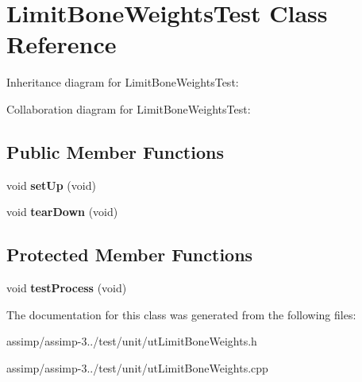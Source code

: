 \hypertarget{class_limit_bone_weights_test}{\section{Limit\+Bone\+Weights\+Test Class Reference}
\label{class_limit_bone_weights_test}
}


Inheritance diagram for Limit\+Bone\+Weights\+Test\+:


Collaboration diagram for Limit\+Bone\+Weights\+Test\+:
\subsection*{Public Member Functions}
\begin{DoxyCompactItemize}
\item 
\hypertarget{class_limit_bone_weights_test_a72d9875ba1090bf81b2e6c8d4cea8cee}{void {\bfseries set\+Up} (void)}\label{class_limit_bone_weights_test_a72d9875ba1090bf81b2e6c8d4cea8cee}

\item 
\hypertarget{class_limit_bone_weights_test_a5d0997856851e502aad8544e4bf195ce}{void {\bfseries tear\+Down} (void)}\label{class_limit_bone_weights_test_a5d0997856851e502aad8544e4bf195ce}

\end{DoxyCompactItemize}
\subsection*{Protected Member Functions}
\begin{DoxyCompactItemize}
\item 
\hypertarget{class_limit_bone_weights_test_af0796f72fe668fce3438ab33dc76cdbf}{void {\bfseries test\+Process} (void)}\label{class_limit_bone_weights_test_af0796f72fe668fce3438ab33dc76cdbf}

\end{DoxyCompactItemize}


The documentation for this class was generated from the following files\+:\begin{DoxyCompactItemize}
\item 
assimp/assimp-\/3../test/unit/ut\+Limit\+Bone\+Weights.\+h\item 
assimp/assimp-\/3../test/unit/ut\+Limit\+Bone\+Weights.\+cpp\end{DoxyCompactItemize}
